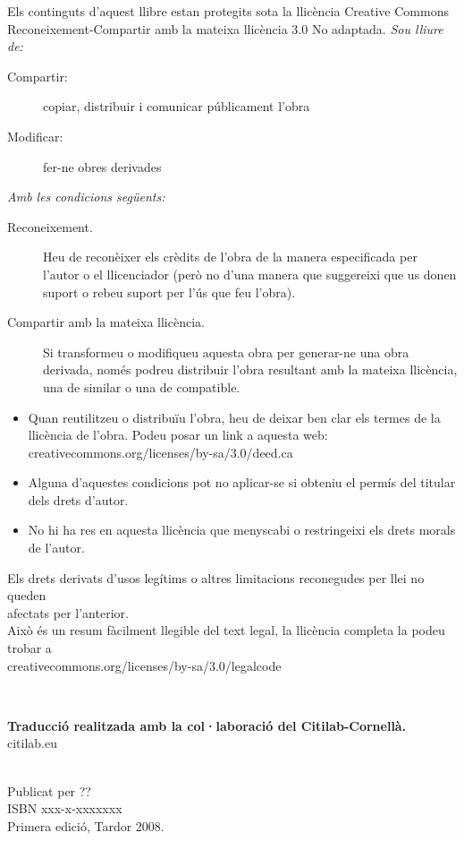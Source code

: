 \documentclass[a4paper,10pt,twoside]{book}
\begin{document}
\begin{footnotesize}
Els continguts d'aquest llibre estan protegits sota la llicència Creative Commons
Reconeixement-Compartir amb la mateixa llicència 3.0 No adaptada.
\newline
\newline
\emph{Sou lliure de:}
\begin{description}
  \item[Compartir: ] copiar, distribuir i comunicar públicament l'obra
  \item[Modificar: ]fer-ne obres derivades
\end{description}
\emph{Amb les condicions següents:}
\begin{description}
  \item[Reconeixement.] Heu de reconèixer els crèdits de l'obra de la manera especificada per l'autor o el llicenciador (però no d'una manera que suggereixi que us donen suport o rebeu suport per l'ús que feu l'obra).
  \item[Compartir amb la mateixa llicència. ] Si transformeu o modifiqueu aquesta obra per generar-ne una obra derivada, només podreu distribuir l'obra resultant amb la mateixa llicència, una de similar o una de compatible.
  \end{description}
\begin{itemize}
  \item Quan reutilitzeu o distribuïu l'obra, heu de deixar ben clar els termes de la llicència de l'obra. Podeu posar un link a aquesta web:
  \textsf{creativecommons.org/licenses/by-sa/3.0/deed.ca}
  \item Alguna d'aquestes condicions pot no aplicar-se si obteniu el permís del titular dels drets d'autor.
  \item No hi ha res en aquesta llicència que menyscabi o restringeixi els drets morals de l'autor.
\end{itemize}
\quad
\parbox{15cm}{
Els drets derivats d'usos legítims o altres limitacions reconegudes per llei no queden\\ afectats per l'anterior.\\
Això és un resum fàcilment llegible del text legal, la llicència completa la podeu trobar a\\
\textsf{creativecommons.org/licenses/by-sa/3.0/legalcode}}\\[1cm]

\quad
\parbox{15cm}{
	\textbf{\small Traducció realitzada amb la col·laboració del Citilab-Cornellà.}\\
	\textsf{citilab.eu}}\\[1cm]


Publicat per ??\\
ISBN xxx-x-xxxxxxx\\
Primera edició, Tardor 2008.
\end{footnotesize}
\end{document}
